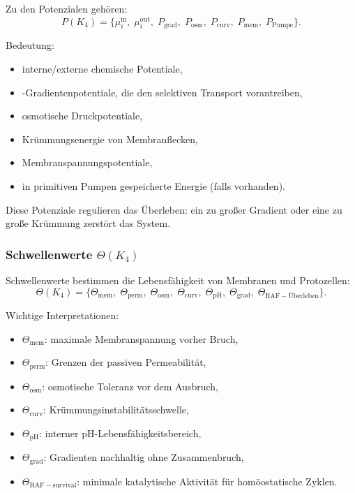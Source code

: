Zu den Potenzialen gehören:
\[
P(K_4) =
\{ \mu_i^{\mathrm{in}},\; \mu_i^{\mathrm{out}},\;
   P_{\mathrm{grad}},\;
   P_{\mathrm{osm}},\;
   P_{\mathrm{curv}},\;
   P_{\mathrm{mem}},\;
   P_{\mathrm{Pumpe}} \}.
\]

Bedeutung:
\begin{itemize}
    \item interne/externe chemische Potentiale,
    \item-Gradientenpotentiale, die den selektiven Transport vorantreiben,
    \item osmotische Druckpotentiale,
    \item Krümmungsenergie von Membranflecken,
    \item Membranspannungspotentiale,
    \item in primitiven Pumpen gespeicherte Energie (falls vorhanden).
\end{itemize}

Diese Potenziale regulieren das Überleben: ein zu großer Gradient oder eine zu große Krümmung
zerstört das System.

\subsubsection{Schwellenwerte \texorpdfstring{$\Theta(K_4)$}{\Theta(K_4)}}

Schwellenwerte bestimmen die Lebensfähigkeit von Membranen und Protozellen:
\[
\Theta(K_4) =
\{\Theta_{\mathrm{mem}},\;
  \Theta_{\mathrm{perm}},\;
  \Theta_{\mathrm{osm}},\;
  \Theta_{\mathrm{curv}},\;
  \Theta_{\mathrm{pH}},\;
  \Theta_{\mathrm{grad}},\;
  \Theta_{\mathrm{RAF-Überleben}}\}.
\]

Wichtige Interpretationen:
\begin{itemize}
    \item $\Theta_{\mathrm{mem}}$: maximale Membranspannung vorher
          Bruch,
    \item $\Theta_{\mathrm{perm}}$: Grenzen der passiven Permeabilität,
    \item $\Theta_{\mathrm{osm}}$: osmotische Toleranz vor dem Ausbruch,
    \item $\Theta_{\mathrm{curv}}$: Krümmungsinstabilitätsschwelle,
    \item $\Theta_{\mathrm{pH}}$: interner pH-Lebensfähigkeitsbereich,
    \item $\Theta_{\mathrm{grad}}$: Gradienten nachhaltig ohne
          Zusammenbruch,
    \item $\Theta_{\mathrm{RAF-survival}}$: minimale katalytische Aktivität
          für homöostatische Zyklen.
\end{itemize}

